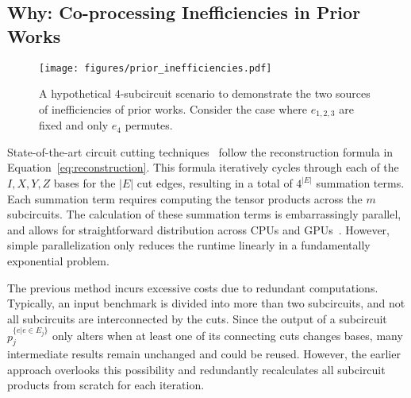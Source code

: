 \subsection{Why: Co-processing Inefficiencies in Prior Works}\label{sec:prior_co_processing}
\begin{figure}[t]
    \centering
    \texttt{[image: figures/prior\_inefficiencies.pdf]}
    \caption{A hypothetical $4$-subcircuit scenario to demonstrate the two sources of inefficiencies of prior works.
    Consider the case where $e_{1,2,3}$ are fixed and only $e_4$ permutes.}
    \label{fig:prior_inefficiencies}
\end{figure}
State-of-the-art circuit cutting techniques~\cite{tang2021cutqc} follow the reconstruction formula in Equation~\ref{eq:reconstruction}.
This formula iteratively cycles through each of the ${I, X, Y, Z}$ bases for the $|E|$ cut edges,
resulting in a total of $4^{|E|}$ summation terms.
Each summation term requires computing the tensor products across the $m$ subcircuits.
The calculation of these summation terms is embarrassingly parallel,
and allows for straightforward distribution across CPUs and GPUs~\cite{tang2021cutqc,tang2022cutting}.
However, simple parallelization only reduces the runtime linearly in a fundamentally exponential problem.

The previous method incurs excessive costs due to redundant computations.
Typically, an input benchmark is divided into more than two subcircuits,
and not all subcircuits are interconnected by the cuts.
Since the output of a subcircuit $p_j^{\{e|e\in E_j\}}$ only alters when at least one of its connecting cuts changes bases,
many intermediate results remain unchanged and could be reused.
However, the earlier approach overlooks this possibility and redundantly recalculates all subcircuit products from scratch for each iteration.

